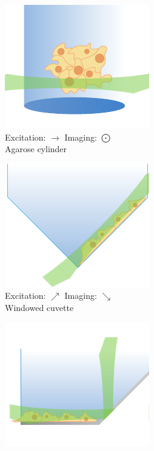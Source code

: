 \begin{figure}
    \centering
    \begin{subfigure}[b]{0.4\linewidth}
         \centering
         \captionsetup{justification=centering}
        \includegraphics{mounting_strategies_cells/fep}
         \caption{Excitation: \(\rightarrow\) \quad  Imaging: \(\bigodot\) \\ Agarose cylinder}
    \end{subfigure}
    \begin{subfigure}[b]{0.4\linewidth}
             \centering
             \captionsetup{justification=centering}
        \includegraphics{mounting_strategies_cells/cuvette}
         \caption{Excitation: \(\nearrow\) \quad  Imaging: \(\searrow\) \\ Windowed cuvette}
    \end{subfigure}
    \begin{subfigure}[b]{0.4\linewidth}
             \centering
             \captionsetup{justification=centering}
        \includegraphics{mounting_strategies_cells/mirrored}

\end{subfigure}
\end{figure}
